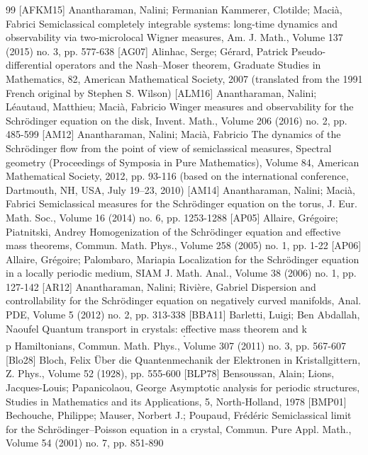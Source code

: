 \documentclass[10pt]{amsart}
\theoremstyle{definition}
\numberwithin{equation}{section}
\begin{document}
\begin{thebibliography}{99}
 [AFKM15] Anantharaman, Nalini; Fermanian Kammerer, Clotilde; Macià, Fabrici Semiclassical completely integrable systems: long-time dynamics and observability via two-microlocal Wigner measures, Am. J. Math., Volume 137 (2015) no. 3, pp. 577-638
 [AG07] Alinhac, Serge; Gérard, Patrick Pseudo-differential operators and the Nash–Moser theorem, Graduate Studies in Mathematics, 82, American Mathematical Society, 2007 (translated from the 1991 French original by Stephen S. Wilson)
 [ALM16] Anantharaman, Nalini; Léautaud, Matthieu; Macià, Fabricio Winger measures and observability for the Schrödinger equation on the disk, Invent. Math., Volume 206 (2016) no. 2, pp. 485-599
 [AM12] Anantharaman, Nalini; Macià, Fabricio The dynamics of the Schrödinger flow from the point of view of semiclassical measures, Spectral geometry (Proceedings of Symposia in Pure Mathematics), Volume 84, American Mathematical Society, 2012, pp. 93-116 (based on the international conference, Dartmouth, NH, USA, July 19–23, 2010)
 [AM14] Anantharaman, Nalini; Macià, Fabrici Semiclassical measures for the Schrödinger equation on the torus, J. Eur. Math. Soc., Volume 16 (2014) no. 6, pp. 1253-1288
 [AP05] Allaire, Grégoire; Piatnitski, Andrey Homogenization of the Schrödinger equation and effective mass theorems, Commun. Math. Phys., Volume 258 (2005) no. 1, pp. 1-22
 [AP06] Allaire, Grégoire; Palombaro, Mariapia Localization for the Schrödinger equation in a locally periodic medium, SIAM J. Math. Anal., Volume 38 (2006) no. 1, pp. 127-142
 [AR12] Anantharaman, Nalini; Rivière, Gabriel Dispersion and controllability for the Schrödinger equation on negatively curved manifolds, Anal. PDE, Volume 5 (2012) no. 2, pp. 313-338
 [BBA11] Barletti, Luigi; Ben Abdallah, Naoufel Quantum transport in crystals: effective mass theorem and k$$\cdot $$p Hamiltonians, Commun. Math. Phys., Volume 307 (2011) no. 3, pp. 567-607
 [Blo28] Bloch, Felix Über die Quantenmechanik der Elektronen in Kristallgittern, Z. Phys., Volume 52 (1928), pp. 555-600
 [BLP78] Bensoussan, Alain; Lions, Jacques-Louis; Papanicolaou, George Asymptotic analysis for periodic structures, Studies in Mathematics and its Applications, 5, North-Holland, 1978
 [BMP01] Bechouche, Philippe; Mauser, Norbert J.; Poupaud, Frédéric Semiclassical limit for the Schrödinger–Poisson equation in a crystal, Commun. Pure Appl. Math., Volume 54 (2001) no. 7, pp. 851-890

\end{thebibliography}
\end{document}

